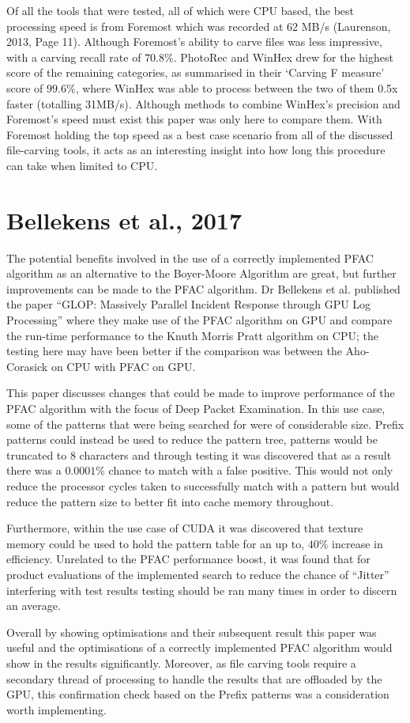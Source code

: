 Of all the tools that were tested, all of which were \ac{CPU} based, the best processing speed is from Foremost which was recorded at 62 \ac{MB}/s (Laurenson, 2013, Page 11).
Although Foremost's ability to carve files was less impressive, with a carving recall rate of $70.8\%$.
PhotoRec and WinHex drew for the highest score of the remaining categories, as summarised in their `Carving F measure' score of $99.6\%$, where WinHex was able to process between the two of them 0.5x faster (totalling 31\ac{MB}/s).
Although methods to combine WinHex's precision and Foremost's speed must exist this paper was only here to compare them.
With Foremost holding the top speed as a best case scenario from all of the discussed file-carving tools, it acts as an interesting insight into how long this procedure can take when limited to \ac{CPU}.

\section*{Bellekens et al., 2017}
The potential benefits involved in the use of a correctly implemented \acl{PFAC} algorithm as an alternative to the Boyer-Moore Algorithm are great, but further improvements can be made to the \ac{PFAC} algorithm.
Dr Bellekens et al. published the paper “GLOP: Massively Parallel Incident Response through \ac{GPU} Log Processing” where they make use of the \ac{PFAC} algorithm on \ac{GPU} and compare the run-time performance to the Knuth Morris Pratt algorithm on \ac{CPU}; the testing here may have been better if the comparison was between the Aho-Corasick on \ac{CPU} with \ac{PFAC} on \ac{GPU}.

This paper discusses changes that could be made to improve performance of the \ac{PFAC} algorithm with the focus of Deep Packet Examination.
In this use case, some of the patterns that were being searched for were of considerable size.
Prefix patterns could instead be used to reduce the pattern tree, patterns would be truncated to 8 characters and through testing it was discovered that as a result there was a $0.0001\%$ chance to match with a false positive.
This would not only reduce the processor cycles taken to successfully match with a pattern but would reduce the pattern size to better fit into cache memory throughout.

Furthermore, within the use case of CUDA it was discovered that texture memory could be used to hold the pattern table for an up to, $40\%$ increase in efficiency. Unrelated to the \ac{PFAC} performance boost, it was found that for product evaluations of the implemented search to reduce the chance of ``Jitter'' interfering with test results testing should be ran many times in order to discern an average.

Overall by showing optimisations and their subsequent result this paper was useful and the optimisations of a correctly implemented \ac{PFAC} algorithm would show in the results significantly.
Moreover, as file carving tools require a secondary thread of processing to handle the results that are offloaded by the \ac{GPU}, this confirmation check based on the Prefix patterns was a  consideration worth implementing.
